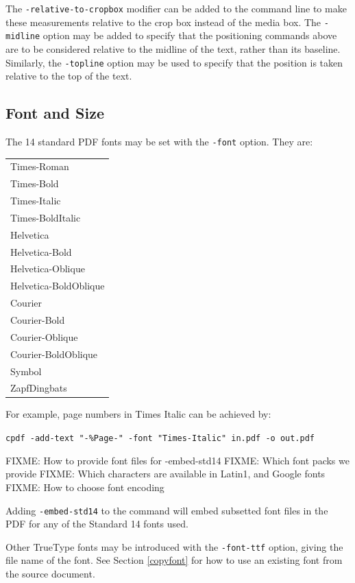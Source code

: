 \documentclass{book}
\begin{document}
The \texttt{-relative-to-cropbox} modifier can be added to the command line to
make these measurements relative to the crop box instead of the media box. The \texttt{-midline} option may be added to specify that the positioning
commands above are to be considered relative to the midline of the text, rather
than its baseline. Similarly, the \texttt{-topline} option may be used to specify that the position is taken relative to the top of the text.

  \subsection{Font and Size}
  The 14 standard PDF fonts may be set with the \texttt{-font} option. They are:

  \vspace{2mm}
  \begin{tabular}{l}
  Times-Roman\\
  Times-Bold\\
  Times-Italic\\
  Times-BoldItalic\\
  Helvetica\\
  Helvetica-Bold\\
  Helvetica-Oblique\\
  Helvetica-BoldOblique\\
  Courier\\
  Courier-Bold\\
  Courier-Oblique\\
  Courier-BoldOblique\\
  Symbol\\
  ZapfDingbats
  \end{tabular}
 \vspace{2mm}

  \noindent For example, page numbers in Times Italic can be achieved by:
  \begin{framed}
    \noindent\small\verb!cpdf -add-text "-%Page-" -font "Times-Italic" in.pdf -o out.pdf!
  \end{framed}

FIXME: How to provide font files for -embed-std14
FIXME: Which font packs we provide
FIXME: Which characters are available in Latin1, and Google fonts
FIXME: How to choose font encoding

  \noindent Adding \texttt{-embed-std14} to the command will embed subsetted font files in the PDF for any of the Standard 14 fonts used.

Other TrueType fonts may be introduced with the \texttt{-font-ttf} option, giving the file name of the font. See Section \ref{copyfont} for how to use an existing font from the source document.
\end{document}
